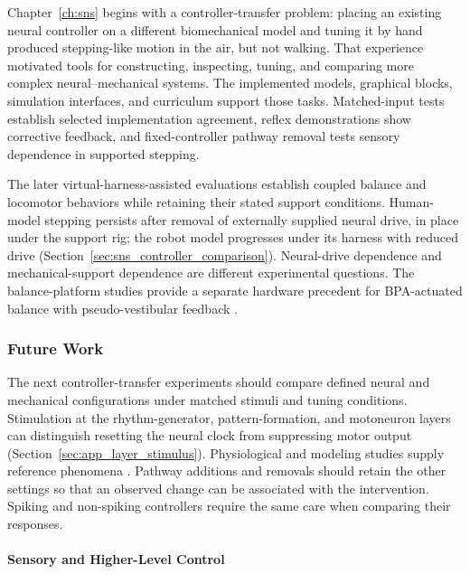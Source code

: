 Chapter~\ref{ch:sns} begins with a controller-transfer problem: placing an existing neural controller on a different biomechanical model and tuning it by hand produced stepping-like motion in the air, but not walking. That experience motivated tools for constructing, inspecting, tuning, and comparing more complex neural--mechanical systems. The implemented models, graphical blocks, simulation interfaces, and curriculum support those tasks. Matched-input tests establish selected implementation agreement, reflex demonstrations show corrective feedback, and fixed-controller pathway removal tests sensory dependence in supported stepping.

The later virtual-harness-assisted evaluations establish coupled balance and locomotor behaviors while retaining their stated support conditions. Human-model stepping persists after removal of externally supplied neural drive, in place under the support rig; the robot model progresses under its harness with reduced drive (Section~\ref{sec:sns_controller_comparison}). Neural-drive dependence and mechanical-support dependence are different experimental questions. The balance-platform studies provide a separate hardware precedent for BPA-actuated balance with pseudo-vestibular feedback \citep{bolen_balance_2024,bolen_selfbalancing_2024,bolen_selfbalancing_srs_2024}.

\subsubsection{Future Work}\label{sec:fw_pipeline}\label{sec:fw_cpg}

The next controller-transfer experiments should compare defined neural and mechanical configurations under matched stimuli and tuning conditions. Stimulation at the rhythm-generator, pattern-formation, and motoneuron layers can distinguish resetting the neural clock from suppressing motor output (Section~\ref{sec:app_layer_stimulus}). Physiological and modeling studies supply reference phenomena \citep{selionov_tonic_2009,rybak_modelling_2006,markin_afferent_2010,shevtsova_modeling_2016}. Pathway additions and removals should retain the other settings so that an observed change can be associated with the intervention. Spiking and non-spiking controllers require the same care when comparing their responses.

\paragraph{Sensory and Higher-Level Control}\label{sec:fw_senses}

